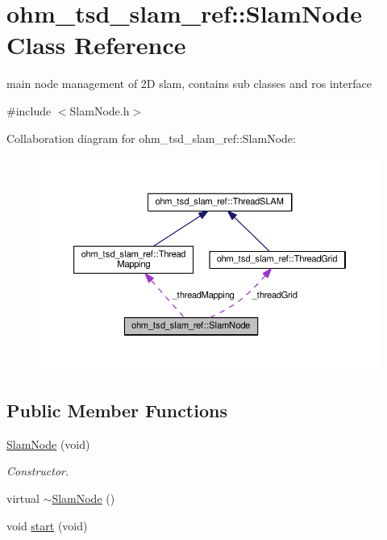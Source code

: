 \hypertarget{classohm__tsd__slam__ref_1_1SlamNode}{\section{ohm\-\_\-tsd\-\_\-slam\-\_\-ref\-:\-:Slam\-Node Class Reference}
\label{classohm__tsd__slam__ref_1_1SlamNode}
}


main node management of 2\-D slam, contains sub classes and ros interface  




{\ttfamily \#include $<$Slam\-Node.\-h$>$}



Collaboration diagram for ohm\-\_\-tsd\-\_\-slam\-\_\-ref\-:\-:Slam\-Node\-:\nopagebreak
\begin{figure}[H]
\begin{center}
\leavevmode
\includegraphics[width=350pt]{classohm__tsd__slam__ref_1_1SlamNode__coll__graph}
\end{center}
\end{figure}
\subsection*{Public Member Functions}
\begin{DoxyCompactItemize}
\item 
\hyperlink{classohm__tsd__slam__ref_1_1SlamNode_af35bd7adca13df47579a682ab3bb827d}{Slam\-Node} (void)
\begin{DoxyCompactList}\small\item\em Constructor. \end{DoxyCompactList}\item 
virtual \hyperlink{classohm__tsd__slam__ref_1_1SlamNode_a0dbbdf08b6ac75aba94c882715d7f49e}{$\sim$\-Slam\-Node} ()
\item 
void \hyperlink{classohm__tsd__slam__ref_1_1SlamNode_a4169535ecfeb3131a67efec9dea2f5c7}{start} (void)
\end{DoxyCompactItemize}
